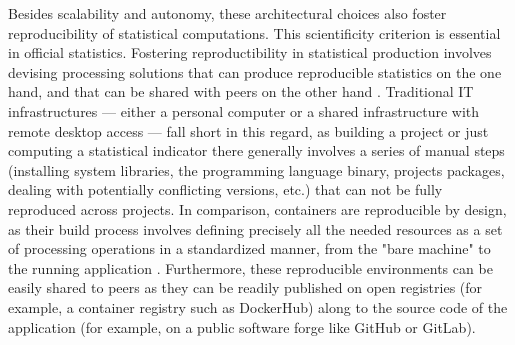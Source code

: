 Besides scalability and autonomy, these architectural choices also foster reproducibility of statistical computations. This scientificity criterion is essential in official statistics. Fostering reproductibility in statistical production involves devising processing solutions that can produce reproducible statistics on the one hand, and that can be shared with peers on the other hand \cite{ntts2019reproducibility}. Traditional IT infrastructures — either a personal computer or a shared infrastructure with remote desktop access — fall short in this regard, as building a project or just computing a statistical indicator there generally involves a series of manual steps (installing system libraries, the programming language binary, projects packages, dealing with potentially conflicting versions, etc.) that can not be fully reproduced across projects. In comparison, containers are reproducible by design, as their build process involves defining precisely all the needed resources as a set of processing operations in a standardized manner, from the "bare machine" to the running application \cite{moreau2023containers}. Furthermore, these reproducible environments can be easily shared to peers as they can be readily published on open registries (for example, a container registry such as DockerHub) along to the source code of the application (for example, on a public software forge like GitHub or GitLab).
